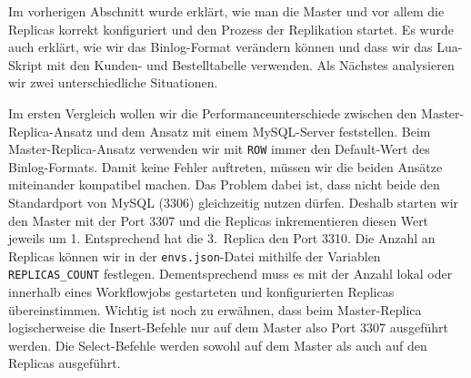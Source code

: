 Im vorherigen Abschnitt wurde erklärt, wie man die Master und vor allem die Replicas korrekt konfiguriert und den Prozess der Replikation startet.
Es wurde auch erklärt, wie wir das Binlog-Format verändern können und dass wir das Lua-Skript mit den Kunden- und Bestelltabelle verwenden.
Als Nächstes analysieren wir zwei unterschiedliche Situationen.

Im ersten Vergleich wollen wir die Performanceunterschiede zwischen den Master-Replica-Ansatz und dem Ansatz mit einem MySQL-Server feststellen.
Beim Master-Replica-Ansatz verwenden wir mit \texttt{ROW} immer den Default-Wert des Binlog-Formats.
Damit keine Fehler auftreten, müssen wir die beiden Ansätze miteinander kompatibel machen.
Das Problem dabei ist, dass nicht beide den Standardport von MySQL (3306) gleichzeitig nutzen dürfen.
Deshalb starten wir den Master mit der Port 3307 und die Replicas inkrementieren diesen Wert jeweils um 1.
Entsprechend hat die 3.\ Replica den Port 3310.
Die Anzahl an Replicas können wir in der \texttt{envs.json}-Datei mithilfe der Variablen \texttt{REPLICAS\_COUNT} festlegen.
Dementsprechend muss es mit der Anzahl lokal oder innerhalb eines Workflowjobs gestarteten und konfigurierten Replicas übereinstimmen.
Wichtig ist noch zu erwähnen, dass beim Master-Replica logischerweise die Insert-Befehle nur auf dem Master also Port 3307 ausgeführt werden.
Die Select-Befehle werden sowohl auf dem Master als auch auf den Replicas ausgeführt.

